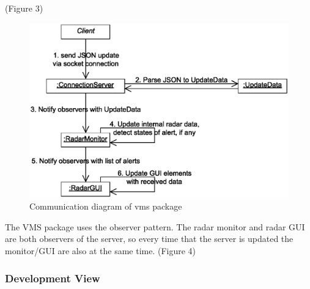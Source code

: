 \documentclass{article}
\begin{document}
\vspace{1cm}

(Figure 3)

\break

\begin{figure}[h]
\caption{Communication diagram of vms package}
\centering
\includegraphics[scale=0.3]{diagrams/vms-communication-diagram.eps}
\end{figure}

The VMS package uses the observer pattern. The radar monitor and radar GUI are both observers of the server, so every time that the server is updated the monitor/GUI are also at the same time.
(Figure 4)

\subsubsection{Development View}
\end{document}
